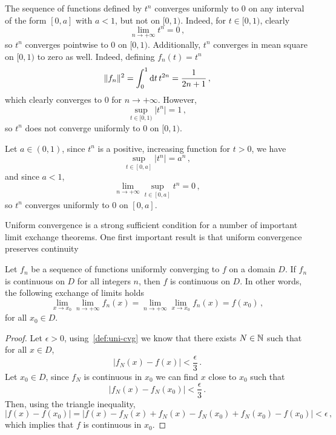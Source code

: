 \begin{example}
	The sequence of functions defined by $t^n$ converges uniformly to $0$ on any interval of
	the form $[0,a]$ with $a<1$, but not on $[0,1)$. Indeed, for $t\in [0,1)$, clearly
	\begin{equation}
		\lim_{n\to+\infty}t^n=0\,,
	\end{equation}
	so $t^n$ converges pointwise to $0$ on $[0,1)$. Additionally, $t^n$ converges in mean
	square on $[0,1)$ to zero as well. Indeed, defining $f_n(t)=t^n$
	\begin{equation}
		\|f_n\|^2=\int_0^1\mathrm{d} t\,t^{2n}=\frac{1}{2n+1}\,,
	\end{equation}
	which clearly converges to $0$ for $n\to+\infty$. However,
	\begin{equation}
		\sup_{t\in[0,1)}|t^n|=1\,,
	\end{equation}
	so $t^n$ does not converge uniformly to $0$ on $[0,1)$.

	Let $a\in(0,1)$, since $t^n$ is a positive, increasing function for $t>0$, we have
	\begin{equation}
		\sup_{t\in[0,a]}|t^n|=a^n\,,
	\end{equation}
	and since $a<1$,
	\begin{equation}
		\lim_{n\to+\infty}\sup_{t\in[0,a]}t^n=0\,,
	\end{equation}
	so $t^n$ converges uniformly to $0$ on $[0,a]$.
\end{example}
Uniform convergence is a strong sufficient condition for a number of important limit
exchange theorems. One first important result is that uniform convergence preserves
continuity
\begin{theorem}
	\label{thm:uniconv-continuous}
	Let $f_n$ be a sequence of functions uniformly converging to $f$ on a domain $D$. If
	$f_n$ is continuous on $D$ for all integers $n$, then $f$ is continuous on $D$. In other
	words, the following exchange of limits holds
	\begin{equation}
		\lim_{x\to x_0}\lim_{n\to+\infty}f_n(x)=\lim_{n\to+\infty}\lim_{x\to
			x_0}f_n(x)=f(x_0)\,,
	\end{equation}
	for all $x_0\in D$.
\end{theorem}
\begin{proof}
	Let $\epsilon>0$, using~\cref{def:uni-cvg} we know that there exists $N\in\mathbb{N}$ such that
	for all $x\in D$,
	\begin{equation}
		|f_N(x)-f(x)|<\frac{\epsilon}{3}\,.
	\end{equation}
	Let $x_0\in D$, since $f_N$ is continuous in $x_0$ we can find $x$ close to $x_0$ such
	that
	\begin{equation}
		|f_N(x)-f_N(x_0)|<\frac{\epsilon}{3}\,.
	\end{equation}
	Then, using the triangle inequality,
	\begin{equation}
		|f(x)-f(x_0)|=|f(x)-f_N(x)+f_N(x)-f_N(x_0)+f_N(x_0)-f(x_0)|<\epsilon\,,
	\end{equation}
	which implies that $f$ is continuous in $x_0$.
\end{proof}
